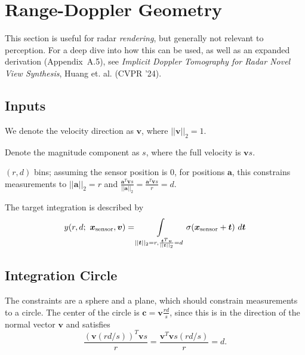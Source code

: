 \section{Range-Doppler Geometry}

\begin{remark}
This section is useful for radar \emph{rendering}, but generally not relevant to perception. For a deep dive into how this can be used, as well as an expanded derivation (Appendix~A.5), see \emph{Implicit Doppler Tomography for Radar Novel View Synthesis}, Huang et. al. (CVPR '24).
\end{remark}

\subsection{Inputs}

\begin{definition}[Velocity]
We denote the velocity direction as $\bm{v}$, where $||\bm{v}||_2 = 1.$
\end{definition}

\begin{definition}[Speed]
Denote the magnitude component as $s$, where the full velocity is $\bm{v}s$.
\end{definition}

\begin{definition}
$(r, d)$ bins; assuming the sensor position is 0, for positions $\bm{a}$, this constrains measurements to $||\bm{a}||_2 = r$ and $\frac{\bm{a}^T\bm{v}s}{||\bm{a}||_2} = \frac{\bm{a}^T\bm{v}s}{r} = d$.
\end{definition}

The target integration is described by
\begin{align*}
    y(r, d ; \ \bm{x}_{\text{sensor}}, \bm{v})
    = \int\displaylimits_{||\bm{t}||_2 = r, \frac{\bm{t}^T\bm{v}}{||\bm{t}||_2} = d} \sigma(\bm{x}_{\text{sensor}} + \bm{t}) \ d\bm{t}
\end{align*}

\subsection{Integration Circle}

The constraints are a sphere and a plane, which should constrain measurements to a circle. The center of the circle is $\bm{c} = \bm{v}\frac{rd}{s}$, since this is in the direction of the normal vector $\bm{v}$ and satisfies
$$ \frac{(\bm{v}(rd/s))^T\bm{v}s}{r} = \frac{\bm{v}^T\bm{v}s(rd/s)}{r} = d.$$


